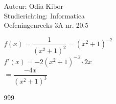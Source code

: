\documentclass[a4paper]{article}
\begin{document}
  
\noindent \large Auteur: Odia Kibor \\
\noindent \large Studierichting: Informatica\\
\noindent \large Oefeningenreeks 3A nr. 20.5\\

\medskip

\normalsize


$f(x) = \dfrac{1}{(x^2+1)^2} = (x^2+1)^{-2}$\\

$f'(x) = -2(x^2+1)^{-3} \cdot 2x$\\

$= \dfrac{-4x}{(x^2+1)^3}$

















\begin{thebibliography}{999}
\end{thebibliography}
\end{document}
